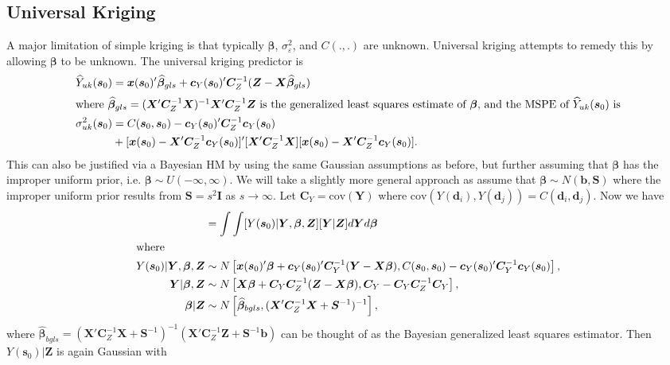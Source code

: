 \documentclass[12pt]{article}
\newcommand{\cov}{\mathrm{cov}}
\begin{document}
\subsection{Universal Kriging}
A major limitation of simple kriging is that typically $\bm{\beta}$, $\sigma^2_{\varepsilon}$, and $C(.,.)$ are unknown. Universal kriging attempts to remedy this by allowing $\bm{\beta}$ to be unknown. The universal kriging predictor is
\begin{align*}
\widehat{Y}_{uk}(\bm{s}_0) &= \bm{x}(\bm{s}_0)'\widehat{\bm{\beta}}_{gls} + \bm{c}_Y(\bm{s}_0)'\bm{C}_Z^{-1}(\bm{Z} - \bm{X}\widehat{\bm{\beta}}_{gls})\\
\intertext{where $\widehat{\bm{\beta}}_{gls} = (\bm{X}'\bm{C}_Z^{-1}\bm{X})^{-1}\bm{X}'\bm{C}_Z^{-1}\bm{Z}$ is the generalized least squares estimate of $\bm{\beta}$, and the MSPE of $\widehat{Y}_{uk}(\bm{s}_0)$ is}
\sigma_{uk}^2(\bm{s}_0) &= C(\bm{s}_0, \bm{s}_0) - \bm{c}_Y(\bm{s}_0)'\bm{C}_Z^{-1}\bm{c}_Y(\bm{s}_0)  \\
& + [\bm{x}(\bm{s}_0)  - \bm{X}'\bm{C}_Z^{-1}\bm{c}_Y(\bm{s}_0)]'[\bm{X}'\bm{C}_Z^{-1}\bm{X}][\bm{x}(\bm{s}_0)  - \bm{X}'\bm{C}_Z^{-1}\bm{c}_Y(\bm{s}_0)].
\end{align*}
This can also be justified via a Bayesian HM by using the same Gaussian assumptions as before, but further assuming that $\bm{\beta}$ has the improper uniform prior, i.e. $\bm{\beta} \sim U(-\infty, \infty)$. We will take a slightly more general approach as assume that $\bm{\beta}\sim N(\bm{b}, \bm{S})$ where the improper uniform prior results from $\bm{S} = s^2\bm{I}$ as $s\to\infty$. Let $\bm{C}_Y = \cov(\bm{Y})$ where $\cov(Y(\bm{d}_i),Y(\bm{d}_j)) = C(\bm{d}_i,\bm{d}_j)$. Now we have
\begin{align*}
[Y(\bm{s}_0)|\bm{Z}] &= \int \int [Y(\bm{s}_0)|\bm{Y}, \bm{\beta}, \bm{Z}][\bm{Y}|\bm{Z}]d\bm{Y}d\bm{\beta}\\
\intertext{where}
Y(\bm{s}_0)|\bm{Y},\bm{\beta}, \bm{Z} &\sim N\left[\bm{x}(\bm{s}_0)'\bm{\beta} + \bm{c}_Y(\bm{s}_0)'\bm{C}_Y^{-1}(\bm{Y} - \bm{X}\bm{\beta}), C(\bm{s}_0, \bm{s}_0) - \bm{c}_Y(\bm{s}_0)'\bm{C}_Y^{-1}\bm{c}_Y(\bm{s}_0)\right],\\
\bm{Y}|\bm{\beta},\bm{Z} &\sim N\left[\bm{X}\bm{\beta} + \bm{C}_Y\bm{C}_Z^{-1}(\bm{Z} - \bm{X}\bm{\beta}), \bm{C}_Y - \bm{C}_Y\bm{C}_Z^{-1}\bm{C}_Y\right],\\
\bm{\beta}|\bm{Z} &\sim N\left[\widehat{\bm{\beta}}_{bgls}, (\bm{X}'\bm{C}_Z^{-1}\bm{X} + \bm{S}^{-1})^{-1}\right],
\end{align*}
where $\widehat{\bm{\beta}}_{bgls} =(\bm{X}'\bm{C}_Z^{-1}\bm{X} + \bm{S}^{-1})^{-1}(\bm{X}'\bm{C}_Z^{-1}\bm{Z} + \bm{S}^{-1}\bm{b})$ can be thought of as the Bayesian generalized least squares estimator. Then $Y(\bm{s}_0)|\bm{Z}$ is again Gaussian with
\end{document}
